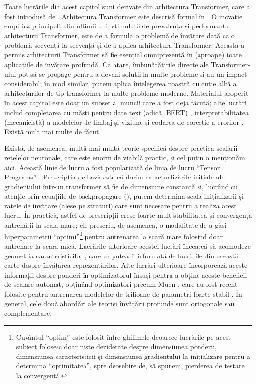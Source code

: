 \documentclass[../../book-main_ro.tex]{subfiles}
\begin{document}
Toate lucrările din acest capitol sunt derivate din arhitectura Transformer, care a fost introdusă de \citet{vaswani2017attention}. Arhitectura Transformer este descrisă formal în . O inovație empirică principală din ultimii ani, stimulată de prevalența și performanța arhitecturii Transformer, este de a formula o problemă de învățare dată ca o problemă secvență-la-secvență și de a aplica arhitectura Transformer. Aceasta a permis arhitecturii Transformer să fie esențial omniprezentă în (aproape) toate aplicațiile de învățare profundă. Ca atare, îmbunătățirile directe ale Transformer-ului pot să se propage pentru a deveni soluții la multe probleme și au un impact considerabil; în mod similar, putem aplica înțelegerea noastră cu cutie albă a arhitecturilor de tip transformer la multe probleme moderne. Materialul acoperit în acest capitol este doar un subset al muncii care a fost deja făcută; alte lucrări includ completarea cu măști pentru date text (adică, BERT) \citep{devlin2019bert,yu2024white}, interpretabilitatea (mecanicistă) a modelelor de limbaj și viziune \citep{bai2024improving} și codarea de corecție a erorilor \citep{zheng2025white}. Există mult mai multe de făcut.

Există, de asemenea, multă mai multă teorie specifică despre practica scalării rețelelor neuronale, care este enorm de viabilă practic, și cel puțin o menționăm aici. Această linie de lucru a fost popularizată de linia de lucru ``Tensor Programs'' \citep{yang2022tensor}. Prescripția de bază este că dorim ca actualizările inițiale ale gradientului într-un transformer să fie de dimensiune constantă și, lucrând cu atenție prin ecuațiile de backpropagare (), putem determina scala inițializării și ratele de învățare (alese pe straturi) care sunt necesare pentru a realiza acest lucru. În practică, astfel de prescripții cresc foarte mult stabilitatea și convergența antrenării la scală mare; ele prescriu, de asemenea, o modalitate de a găsi hiperparametrii ``optimi''\footnote{Cuvântul ``optim'' este folosit între ghilimele deoarece lucrările pe acest subiect folosesc doar niște deziderate despre dimensiunea ponderii, dimensiunea caracteristicii și dimensiunea gradientului la inițializare pentru a determina ``optimitatea'', spre deosebire de, să spunem, pierderea de testare la convergență.} pentru antrenarea la scară mare folosind doar antrenare la scară mică. Lucrările ulterioare acestei lucrări încearcă să acomodeze geometria caracteristicilor \citep{bernstein2024oldoptimizernewnorm}, care ar putea fi informată de lucrările din această carte despre învățarea reprezentărilor. Alte lucrări ulterioare încorporează aceste informații despre ponderi în optimizatorul însuși pentru a obține aceste beneficii de scalare automat, obținând optimizatori precum Muon \citep{jordan6muon}, care au fost recent folosite pentru antrenarea modelelor de trilioane de parametri foarte stabil \citep{moonshot2025kimi}. În general, cele două abordări ale teoriei învățării profunde sunt ortogonale sau complementare.
\end{document}
